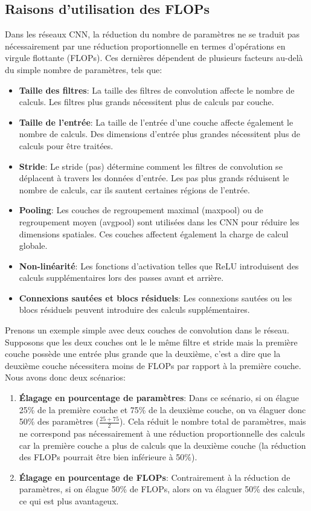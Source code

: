 \subsection{Raisons d'utilisation des FLOPs}
Dans les réseaux CNN, la réduction du nombre de paramètres ne se traduit pas nécessairement par une réduction proportionnelle en termes d'opérations en virgule flottante (FLOPs). Ces dernières dépendent de plusieurs facteurs au-delà du simple nombre de paramètres, tels que:
\begin{itemize}
    \item \textbf{Taille des filtres}: La taille des filtres de convolution affecte le nombre de calculs. Les filtres plus grands nécessitent plus de calculs par couche.
    \item \textbf{Taille de l'entrée}: La taille de l'entrée d'une couche affecte également le nombre de calculs. Des dimensions d'entrée plus grandes nécessitent plus de calculs pour être traitées.
    \item \textbf{Stride}: Le stride (pas) détermine comment les filtres de convolution se déplacent à travers les données d'entrée. Les pas plus grands réduisent le nombre de calculs, car ils sautent certaines régions de l'entrée.
    \item \textbf{Pooling}: Les couches de regroupement maximal (maxpool) ou de regroupement moyen (avgpool) sont utilisées dans les CNN pour réduire les dimensions spatiales. Ces couches affectent également la charge de calcul globale.
    \item \textbf{Non-linéarité}: Les fonctions d'activation telles que ReLU introduisent des calculs supplémentaires lors des passes avant et arrière.
    \item \textbf{Connexions sautées et blocs résiduels}: Les connexions sautées ou les blocs résiduels peuvent introduire des calculs supplémentaires.
\end{itemize}

Prenons un exemple simple avec deux couches de convolution dans le réseau. Supposons que les deux couches ont le le même filtre et stride mais la première couche possède une entrée plus grande que la deuxième, c'est a dire que la deuxième couche nécessitera moins de FLOPs par rapport à la première couche. Nous avons donc deux scénarios: 
\begin{enumerate}
    \item \textbf{Élagage en pourcentage de paramètres}: Dans ce scénario, si on élague 25\% de la première couche et 75\% de la deuxième couche, on va élaguer donc 50\% des paramètres ($\frac{25+75}{2}$). Cela réduit le nombre total de paramètres, mais ne correspond pas nécessairement à une réduction proportionnelle des calculs car la première couche a plus de calculs que la deuxième couche (la réduction des FLOPs pourrait être bien inférieure à 50\%).
    \item \textbf{Élagage en pourcentage de FLOPs}: Contrairement à la réduction de paramètres, si on élague 50\% de FLOPs, alors on va élaguer 50\% des calculs, ce qui est plus avantageux.
\end{enumerate}


